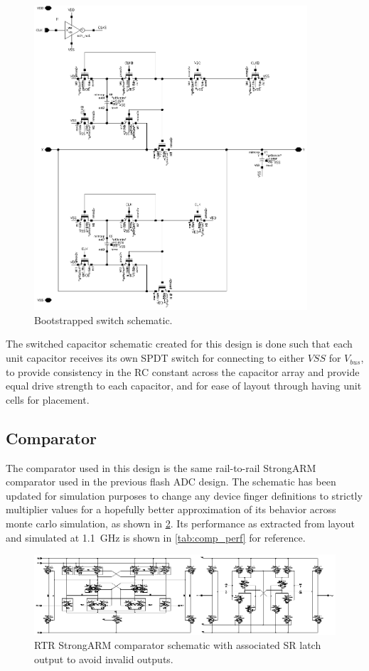 \documentclass[11pt,letterpaper]{article}
\begin{document}
\begin{figure}[htbp!]
		\centering
		\includegraphics[width=4in]{images/sch_bootsw.eps}
		\caption{Bootstrapped switch schematic.}\label{fig:boot}
\end{figure}

The switched capacitor schematic created for this design is done such that each unit capacitor receives its own SPDT switch for connecting to either \(VSS\) for \(V_{bus}\), to provide consistency in the RC constant across the capacitor array and provide equal drive strength to each capacitor, and for ease of layout through having unit cells for placement.

\subsection{Comparator}

The comparator used in this design is the same rail-to-rail StrongARM comparator used in the previous flash ADC design. The schematic has been updated for simulation purposes to change any device finger definitions to strictly multiplier values for a hopefully better approximation of its behavior across monte carlo simulation, as shown in \cref{fig:comp_sch}. Its performance as extracted from layout and simulated at \qty{1.1}{\GHz} is shown in \cref{tab:comp_perf} for reference.

\begin{figure}[htbp!]
		\centering
	    \includegraphics[width=\textwidth]{images/sch_comp_sar.eps}
		\caption{RTR StrongARM comparator schematic with associated SR latch output to avoid invalid outputs.}\label{fig:comp_sch}
\end{figure}
\end{document}
